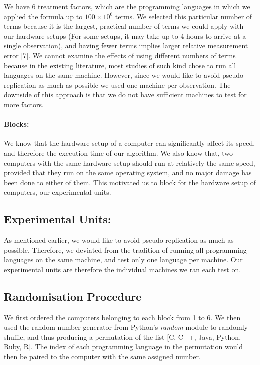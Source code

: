 \documentclass[12pt,halfline,a4paper,]{ouparticle}
\begin{document}
We have 6 treatment factors, which are the programming languages in
which we applied the formula up to \(100 \times 10^6\) terms. We
selected this particular number of terms because it is the largest,
practical number of terms we could apply with our hardware setups (For
some setups, it may take up to 4 hours to arrive at a single
observation), and having fewer terms implies larger relative measurement
error {[}7{]}. We cannot examine the effects of using different numbers
of terms because in the existing literature, most studies of such kind
chose to run all languages on the same machine. However, since we would
like to avoid pseudo replication as much as possible we used one machine
per observation. The downside of this approach is that we do not have
sufficient machines to test for more factors.

\paragraph{Blocks:}\label{blocks}

We know that the hardware setup of a computer can significantly affect
its speed, and therefore the execution time of our algorithm. We also
know that, two computers with the same hardware setup should run at
relatively the same speed, provided that they run on the same operating
system, and no major damage has been done to either of them. This
motivated us to block for the hardware setup of computers, our
experimental units.

\subsection{Experimental Units:}\label{experimental-units}

As mentioned earlier, we would like to avoid pseudo replication as much
as possible. Therefore, we deviated from the tradition of running all
programming languages on the same machine, and test only one language
per machine. Our experimental units are therefore the individual
machines we ran each test on.

\subsection{Randomisation Procedure}\label{randomisation-procedure}

We first ordered the computers belonging to each block from 1 to 6. We
then used the random number generator from Python's \emph{random} module
to randomly shuffle, and thus producing a permutation of the list {[}C,
C++, Java, Python, Ruby, R{]}. The index of each programming language in
the permutation would then be paired to the computer with the same
assigned number.
\end{document}
